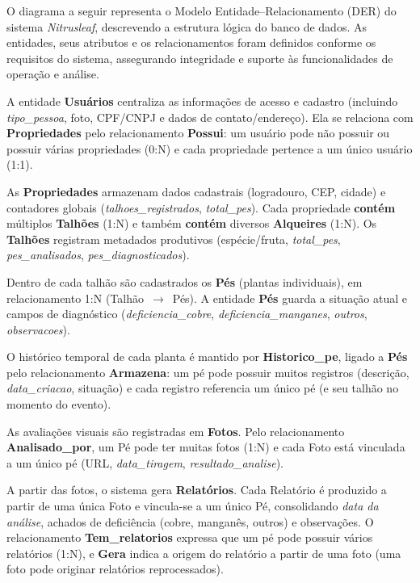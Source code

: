 
\medskip
O diagrama a seguir representa o Modelo Entidade–Relacionamento (DER) do sistema \textit{Nitrusleaf}, 
descrevendo a estrutura lógica do banco de dados. As entidades, seus atributos e os relacionamentos 
foram definidos conforme os requisitos do sistema, assegurando integridade e suporte às funcionalidades 
de operação e análise.

\medskip
A entidade \textbf{Usuários} centraliza as informações de acesso e cadastro 
(incluindo \textit{tipo\_pessoa}, foto, CPF/CNPJ e dados de contato/endereço). Ela se relaciona 
com \textbf{Propriedades} pelo relacionamento \textbf{Possui}: um usuário pode não possuir ou 
possuir várias propriedades (0:N) e cada propriedade pertence a um único usuário (1:1).
\medskip

As \textbf{Propriedades} armazenam dados cadastrais (logradouro, CEP, cidade) e contadores globais 
(\textit{talhoes\_registrados}, \textit{total\_pes}). Cada propriedade \textbf{contém} múltiplos 
\textbf{Talhões} (1:N) e também \textbf{contém} diversos \textbf{Alqueires} (1:N). Os \textbf{Talhões} 
registram metadados produtivos (espécie/fruta, \textit{total\_pes}, \textit{pes\_analisados}, 
\textit{pes\_diagnosticados}).
\medskip

Dentro de cada talhão são cadastrados os \textbf{Pés} (plantas individuais), em relacionamento 1:N 
(Talhão~$\rightarrow$~Pés). A entidade \textbf{Pés} guarda a situação atual e campos de diagnóstico 
(\textit{deficiencia\_cobre}, \textit{deficiencia\_manganes}, \textit{outros}, \textit{observacoes}).
\medskip

O histórico temporal de cada planta é mantido por \textbf{Historico\_pe}, ligado a \textbf{Pés} pelo 
relacionamento \textbf{Armazena}: um pé pode possuir muitos registros (descrição, \textit{data\_criacao}, 
situação) e cada registro referencia um único pé (e seu talhão no momento do evento).
\medskip

As avaliações visuais são registradas em \textbf{Fotos}. Pelo relacionamento \textbf{Analisado\_por}, 
um Pé pode ter muitas fotos (1:N) e cada Foto está vinculada a um único pé (URL, \textit{data\_tiragem}, 
\textit{resultado\_analise}).
\medskip

A partir das fotos, o sistema gera \textbf{Relatórios}. Cada Relatório é produzido a partir de uma 
única Foto e vincula-se a um único Pé, consolidando \textit{data da análise}, achados de deficiência 
(cobre, manganês, outros) e observações. O relacionamento \textbf{Tem\_relatorios} expressa que um pé 
pode possuir vários relatórios (1:N), e \textbf{Gera} indica a origem do relatório a partir de uma foto 
(uma foto pode originar relatórios reprocessados).
\medskip

